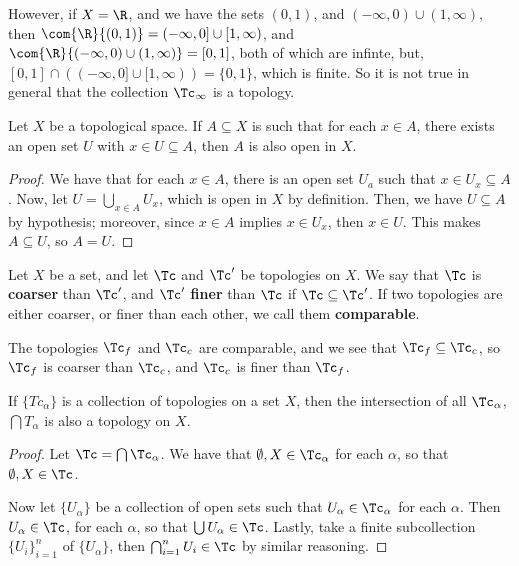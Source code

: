 \begin{example}
\begin{enumerate}
                However, if $X=\R$, and we have the sets $(0,1)$, and
                $(-\infty,0) \cup (1, \infty)$, then
                $\com{\R}{(0,1)}=(-\infty,0] \cup [1,\infty)$, and
                $\com{\R}{(-\infty,0) \cup (1, \infty)}=[0,1]$, both of which
                are infinte, but, $[0,1] \cap ((-\infty,0] \cup
                [1,\infty))=\{0,1\}$, which is finite. So it is not true in
                general that the collection $\Tc_\infty$ is a topology.
    \end{enumerate}
\end{example}

\begin{lemma}\label{1.1.1}
    Let $X$ be a topological space. If  $A \subseteq X$ is such that for each
    $x \in A$, there exists an open set  $U$ with  $x \in U \subseteq A$, then
    $A$ is also open in  $X$.
\end{lemma}
\begin{proof}
    We have that for each $x \in A$, there is an open set  $U_a$ such that  $x
    \in U_x \subseteq A$. Now, let  $U=\bigcup_{x \in A}{U_x}$, which is open in
    $X$ by definition. Then, we have $U \subseteq A$ by hypothesis; moreover,
    since  $x \in A$ implies  $x \in U_x$, then  $x \in U$. This makes
    $A \subseteq U$, so  $A=U$.
\end{proof}

\begin{definition}
    Let $X$ be a set, and let $\Tc$ and  $\Tc'$ be topologies on  $X$. We say that
    $\Tc$ is  \textbf{coarser} than $\Tc'$, and $\Tc'$ \textbf{finer} than $\Tc$ if
    $\Tc \subseteq \Tc'$.
    If two topologies are either coarser, or finer than each other, we call them
    \textbf{comparable}.
\end{definition}

\begin{example}
    The topologies $\Tc_f$ and  $\Tc_c$ are comparable, and we see that  $\Tc_f
    \subseteq \Tc_c$, so $\Tc_f$ is coarser than  $\Tc_c$, and  $\Tc_c$ is finer than
    $\Tc_f$.
\end{example}

\begin{lemma}\label{1.1.2}
    If $\{Tc_\alpha\}$ is a collection of topologies on a set $X$, then the
    intersection of all  $\Tc_\alpha$,  $\bigcap{T_\alpha}$ is also a topology
    on $X$.
\end{lemma}
\begin{proof}
    Let $\Tc=\bigcap{\Tc_\alpha}$. We have that $\emptyset, X \in \Tc_\alpha$
    for each  $\alpha$, so that  $\emptyset, X \in \Tc$.

    Now let  $\{U_\alpha\}$ be a collection of open sets such that $U_\alpha \in
    \Tc_\alpha$ for each  $\alpha$. Then  $U_\alpha \in \Tc$, for each
    $\alpha$, so that  $\bigcup{U_\alpha} \in \Tc$. Lastly, take a finite
    subcollection $\{U_i\}_{i=1}^n$ of $\{U_\alpha\}$, then
    $\bigcap_{i=1}^n{U_i} \in \Tc$ by similar reasoning.
\end{proof}

